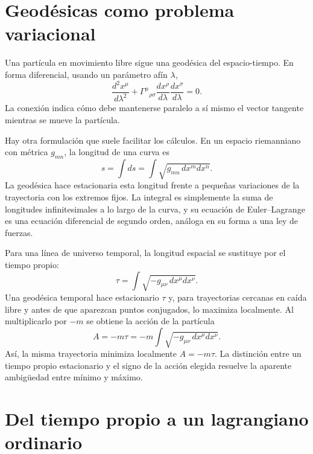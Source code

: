 \section{Geodésicas como problema variacional}

Una partícula en movimiento libre sigue una geodésica del espacio-tiempo. En forma diferencial, usando un parámetro afín \(\lambda\),
\begin{equation}
\frac{d^2x^\mu}{d\lambda^2}
+\Gamma^\mu{}_{\rho\sigma}
\frac{dx^\rho}{d\lambda}
\frac{dx^\sigma}{d\lambda}=0.
\label{eq:l5-geodesic}
\end{equation}
La conexión indica cómo debe mantenerse paralelo a sí mismo el vector tangente mientras se mueve la partícula.

Hay otra formulación que suele facilitar los cálculos. En un espacio riemanniano con métrica \(g_{mn}\), la longitud de una curva es
\begin{equation}
s=\int ds
=\int\sqrt{g_{mn}\,dx^m dx^n}.
\label{eq:l5-spatial-length}
\end{equation}
La geodésica hace estacionaria esta longitud frente a pequeñas variaciones de la trayectoria con los extremos fijos. La integral es simplemente la suma de longitudes infinitesimales a lo largo de la curva, y su ecuación de Euler--Lagrange es una ecuación diferencial de segundo orden, análoga en su forma a una ley de fuerzas.

Para una línea de universo temporal, la longitud espacial se sustituye por el tiempo propio:
\begin{equation}
\tau
=\int\sqrt{-g_{\mu\nu}\,dx^\mu dx^\nu}.
\label{eq:l5-proper-time-functional}
\end{equation}
Una geodésica temporal hace estacionario \(\tau\) y, para trayectorias cercanas en caída libre y antes de que aparezcan puntos conjugados, lo maximiza localmente. Al multiplicarlo por \(-m\) se obtiene la acción de la partícula
\begin{equation}
A=-m\tau
=-m\int\sqrt{-g_{\mu\nu}\,dx^\mu dx^\nu}.
\label{eq:l5-particle-action}
\end{equation}
Así, la misma trayectoria minimiza localmente \(A=-m\tau\). La distinción entre un tiempo propio estacionario y el signo de la acción elegida resuelve la aparente ambigüedad entre mínimo y máximo.

\section{Del tiempo propio a un lagrangiano ordinario}

